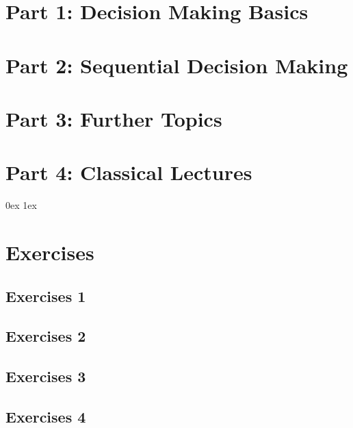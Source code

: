 \clearpage
\section{Part 1: Decision Making Basics}





\clearpage
\section{Part 2: Sequential Decision Making}




\clearpage
\section{Part 3: Further Topics}



\clearpage
\section{Part 4: Classical Lectures}











\clearpage
\fancyhfoffset{0mm}
\parindent 0ex
\parskip 1ex

\DefineShortVerb{\@}

\section{Exercises}
\subsection{Exercises 1}

\subsection{Exercises 2}

\subsection{Exercises 3}

\subsection{Exercises 4}

